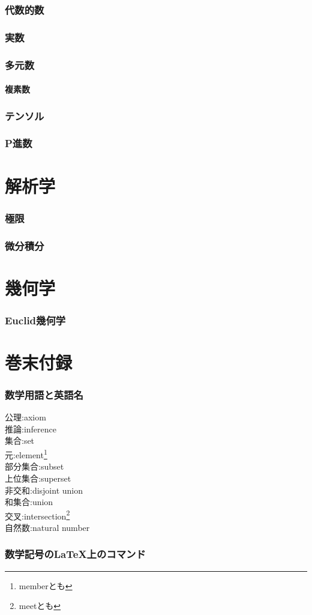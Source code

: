\documentclass[hyperref,a4paper,12pt]{kininaruki}
\begin{document}
\section{代数的数}
\newpage
\section{実数}
\newpage
\section{多元数}
\subsection{複素数}
\newpage
\section{テンソル}
\newpage
\section{P進数}
\newpage
\part{解析学}
\section{極限}
\newpage
\section{微分積分}
\newpage
\part{幾何学}
\section{Euclid幾何学}
\part{巻末付録}
\section{数学用語と英語名}
\begin{multicols*}{3}
\noindent
\hypertarget{axiom}{公理}:axiom\\
\hypertarget{inference}{推論}:inference\\
\hypertarget{set}{集合}:set\\
\hypertarget{member}{元}:element\footnote{memberとも}\\
\hypertarget{subset}{部分集合}:subset\\
\hypertarget{superset}{上位集合}:superset\\
\hypertarget{dunion}{非交和}:disjoint union\\
\hypertarget{union}{和集合}:union\\
\hypertarget{intersection}{交叉}:intersection\footnote{meetとも}\\
\hypertarget{natural}{自然数}:natural number\\
\end{multicols*}
\newpage
\section{数学記号のLaTeX上のコマンド}
\newpage
{} {}
\printindex
\end{document}
